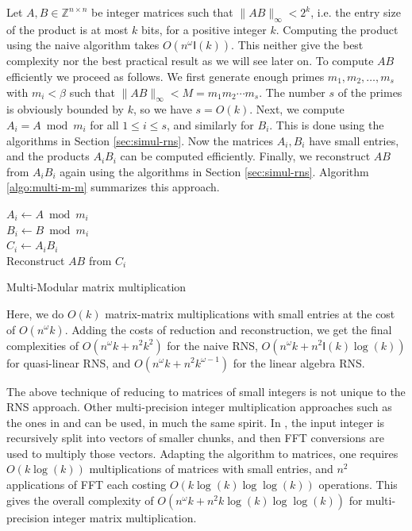 \documentclass[acmtoms]{acmsmall}
\def\Z{\mathbb{Z}}
\def\I{\mathsf{I}}
\begin{document}
Let $A, B \in \Z^{n \times n}$ be integer matrices such that $\lVert AB \rVert_\infty < 2^k$, 
i.e. the entry size of the product is at most $k$ bits, for a positive integer $k$. Computing the 
product using the naive algorithm takes $O(n^\omega \I(k))$. This neither give the best complexity 
nor the best practical result as we will see later on. To compute $AB$ efficiently we proceed as 
follows. We first generate enough primes $m_1, m_2, \dots, m_s$ with $m_i < \beta$ such that 
$\lVert AB \rVert_\infty < M = m_1m_2 \cdots m_s$. The number $s$ of the primes is obviously 
bounded by $k$, so we have $s = O(k)$. Next, we compute $A_i = A \bmod m_i$ for all $1 
\le i \le s$, and similarly for $B_i$. This is done using the algorithms in Section 
\ref{sec:simul-rns}. Now the matrices $A_i, B_i$ have small entries, and the 
products $A_iB_i$ can be computed efficiently. Finally, we reconstruct $AB$ from $A_iB_i$ again 
using the algorithms in Section \ref{sec:simul-rns}. Algorithm \ref{algo:multi-m-m} summarizes this 
approach.

\vspace*{2mm}
\begin{algorithm}[H]
	{ 
		$A_i \leftarrow A \bmod m_i$ \\
		$B_i \leftarrow B \bmod m_i$ \\
	} 
	{ 
		$C_i \leftarrow A_iB_i$ \\
	}
	Reconstruct $AB$ from $C_i$ \\
	\caption{Multi-Modular matrix multiplication}
	\label{algo:multi-m-m}
\end{algorithm}
\vspace*{2mm}

Here, we do $O(k)$ matrix-matrix multiplications with small entries at the cost of $O(n^\omega k)$. 
Adding the costs of reduction and reconstruction, we get the final complexities of $O(n^\omega k + 
n^2k^2)$ for the naive RNS, $O(n^\omega k + n^2\I(k)\log(k))$ for quasi-linear RNS, and $O(n^\omega 
k + n^2k^{\omega - 1})$ for the linear algebra RNS. 

The above technique of reducing to matrices of small integers is not unique to the RNS approach. 
Other multi-precision integer multiplication approaches such as the ones in \cite{Schonhage1971} 
and \cite{Pollard1971} can be used, in much the same spirit. In \cite{Schonhage1971}, the input 
integer is recursively split into vectors of smaller chunks, and then FFT conversions are used to 
multiply those vectors. Adapting the algorithm to matrices, one requires $O(k \log(k))$ 
multiplications of matrices with small entries, and $n^2$ applications of FFT each costing $O(k 
\log(k)\log\log(k))$ operations. This gives the overall complexity of $O(n^\omega k + n^2k 
\log(k)\log\log(k))$ for multi-precision integer matrix multiplication.
\end{document}
